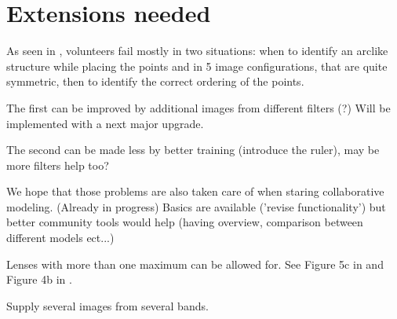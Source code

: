 \section{Extensions needed} \label{sec:todo}

As seen in , volunteers fail mostly in two situations:
when to identify an arclike structure while placing the points
and in 5 image configurations, that are quite symmetric, then to identify the correct ordering of the points.

The first can be improved by additional images from different filters (?)
Will be implemented with a next major \spl upgrade.

The second can be made less by better training (introduce the ruler), may be more filters help too?

We hope that those problems are also taken care of when staring collaborative modeling. (Already in progress)
Basics are available ('revise functionality') but better community tools would help (having overview, comparison between different models ect...)

Lenses with more than one maximum can be allowed for.  See Figure 5c
in \citep{2001ApJ...557..594R} and Figure 4b in
\cite{2003ApJ...590...39K}.

Supply several images from several bands.

